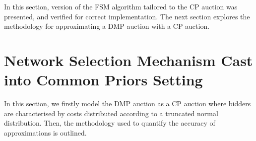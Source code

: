 
In this section, version of the FSM algorithm tailored to the CP auction was presented, and verified for correct implementation. The next section explores the methodology for approximating a DMP auction with a CP auction.

\section{Network Selection Mechanism Cast into Common Priors Setting} %
\label{sec:network_selection_mechanism_cast_into_common_priors_setting_approximation}
In this section, we firstly model the DMP auction as a CP auction where bidders are characterised by costs distributed according to a truncated normal distribution. Then, the methodology used to quantify the accuracy of approximations is outlined.

